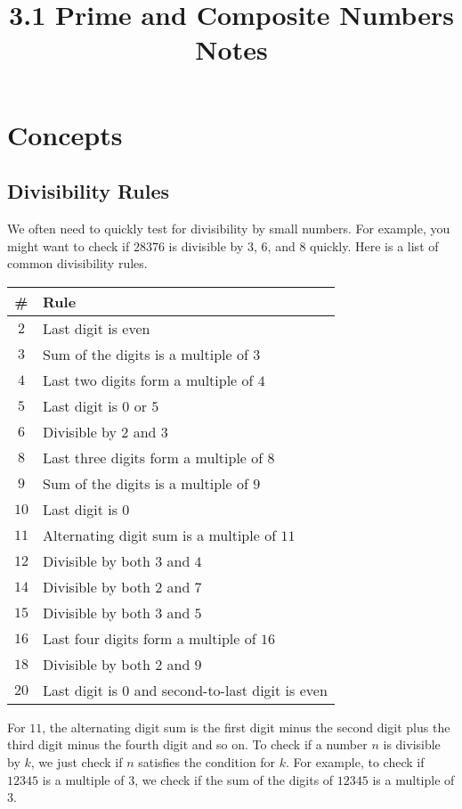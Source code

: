 \documentclass{article}
\title{3.1 Prime and Composite Numbers Notes}
\author{}
\date{}
\begin{document}
\maketitle

\section*{Concepts}
\begin{multicols}{2}
	
	\subsection*{Divisibility Rules}
	We often need to quickly test for divisibility by small numbers.
	For example, you might want to check if $28376$ is divisible by $3$, $6$, and $8$ quickly.
	Here is a list of common divisibility rules.
	
	\begin{tabular}{|c|l|}
		\hline
		\# & Rule \\
		\hline
		$2$    & Last digit is even \\
		$3$    & Sum of the digits is a multiple of $3$ \\
		$4$    & Last two digits form a multiple of $4$ \\
		$5$    & Last digit is $0$ or $5$ \\
		$6$    & Divisible by $2$ and $3$ \\
		$8$    & Last three digits form a multiple of $8$ \\
		$9$    & Sum of the digits is a multiple of $9$ \\
		$10$   & Last digit is $0$ \\
		$11$   & Alternating digit sum is a multiple of $11$ \\
		$12$   & Divisible by both $3$ and $4$ \\
		$14$   & Divisible by both $2$ and $7$ \\
		$15$   & Divisible by both $3$ and $5$ \\
		$16$   & Last four digits form a multiple of $16$ \\
		$18$   & Divisible by both $2$ and $9$ \\
		$20$   & Last digit is $0$ and second-to-last digit is even \\
		\hline
	\end{tabular}
	
	For $11$, the alternating digit sum is the first digit minus the second digit plus the
	third digit minus the fourth digit and so on.
	To check if a number $n$ is divisible by $k$, we just check if $n$ satisfies the condition
	for $k$.
	For example, to check if $12345$ is a multiple of $3$,
	we check if the sum of the digits of $12345$ is a multiple of $3$.
	

\end{multicols}
\end{document}
